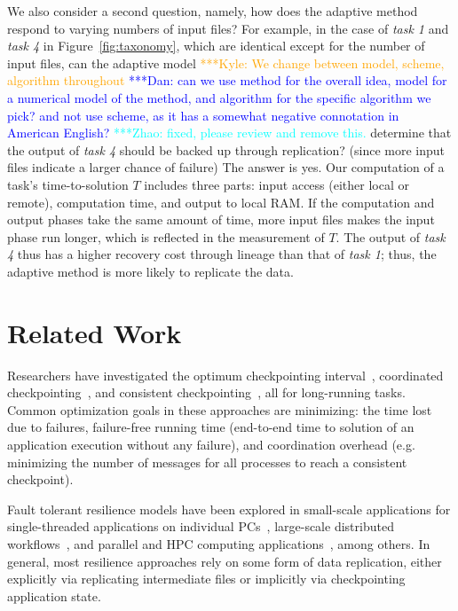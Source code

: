 \documentclass{sig-alternate}
\newcommand{\katznote}[1]{ {\textcolor{blue}    { ***Dan:      #1 }}}
\newcommand{\zhaonote}[1]{{\textcolor{cyan}    { ***Zhao:      #1 }}}
\newcommand{\kylenote}[1]{{\textcolor{orange}    { ***Kyle:      #1 }}}
\newcommand{\katznote}[1]{}
\newcommand{\zhaonote}[1]{}
\newcommand{\kylenote}[1]{}
\begin{document}
We also consider a second question, namely, how does the adaptive method respond to varying numbers of input files?
For example, in the case of {\em task 1} and {\em task 4} in Figure~\ref{fig:taxonomy}, which are identical except for the number of input files, can the adaptive model \kylenote{We change between model, scheme, algorithm throughout} \katznote{can we use method for the overall idea, model for a numerical model of the method, and algorithm for the specific algorithm we pick?  and not use scheme, as it has a somewhat negative connotation in American English?} 
\zhaonote{fixed, please review and remove this.}
determine that the output of {\em task 4} should be backed up through replication? (since more input files indicate a larger chance of failure)
The answer is yes.
Our computation of a task's time-to-solution $T$ includes three parts: input access (either local or remote), computation time, and output to local RAM. If the computation and output phases take the same amount of time, more input files makes the input phase run longer, which is reflected in the measurement of $T$. The output of {\em task 4} thus has a higher recovery cost through lineage than that of {\em task 1}; thus, the adaptive method is more likely to replicate the data.




\section{Related Work}
\label{sec:Related}
Researchers have investigated the optimum checkpointing interval~\cite{young1974first, daly2006higher}, coordinated checkpointing~\cite{chandy1985distributed}, and consistent checkpointing~\cite{elnozahy1992performance}, all for long-running tasks.  Common optimization goals in these approaches are minimizing: the time lost due to failures, failure-free running time (end-to-end time to solution of an application execution without any failure), and coordination overhead (e.g. minimizing the number of messages for all processes to reach a consistent checkpoint). 

Fault tolerant resilience models have been explored in small-scale applications for single-threaded applications on individual PCs~\cite{condor1988, libckpt1994}, large-scale distributed workflows~\cite{uncoordinated2010}, and parallel and HPC computing applications~\cite{mist1995, consistent1994,FTworkshop2009}, among others. In  general, most resilience approaches rely on some form of data replication, either explicitly via replicating intermediate files or implicitly via checkpointing application state.
\end{document}
